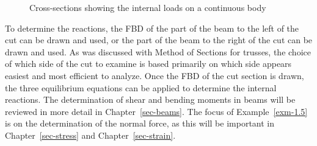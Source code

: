 \documentclass[
  letterpaper,
  DIV=11,
  numbers=noendperiod]{scrreprt}
\theoremstyle{definition}
\theoremstyle{remark}
\begin{document}
\begin{figure}


\caption{\label{fig-1.2}Cross-sections showing the internal loads on a
continuous body}

\end{figure}%

To determine the reactions, the FBD of the part of the beam to the left
of the cut can be drawn and used, or the part of the beam to the right
of the cut can be drawn and used. As was discussed with Method of
Sections for trusses, the choice of which side of the cut to examine is
based primarily on which side appears easiest and most efficient to
analyze. Once the FBD of the cut section is drawn, the three equilibrium
equations can be applied to determine the internal reactions. The
determination of shear and bending moments in beams will be reviewed in
more detail in Chapter~\ref{sec-beams}. The focus of
Example~\ref{exm-1.5} is on the determination of the normal force, as
this will be important in Chapter~\ref{sec-stress} and
Chapter~\ref{sec-strain}.
\end{document}
